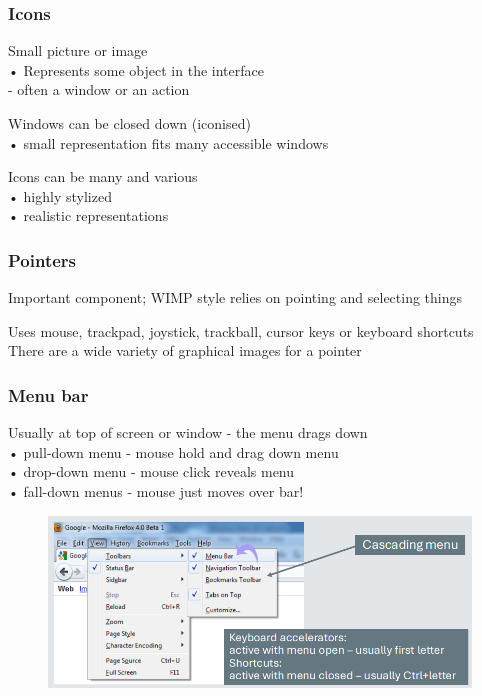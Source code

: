 \documentclass[]{project_plan}
\begin{document}
\subsubsection{Icons}
Small picture or image\\
• Represents some object in the interface\\
- often a window or an action

Windows can be closed down (iconised)\\
• small representation fits many accessible windows

Icons can be many and various\\
• highly stylized\\
• realistic representations

\subsubsection{Pointers}
Important component; WIMP style relies on pointing and selecting things

Uses mouse, trackpad, joystick, trackball, cursor keys or keyboard shortcuts\\
There are a wide variety of graphical images for a pointer

\subsubsection{Menu bar}
Usually at top of screen or window - the menu drags down\\
• pull-down menu - mouse hold and drag down menu\\
• drop-down menu - mouse click reveals menu\\
• fall-down menus - mouse just moves over bar!

\begin{figure}[h!]
  \centering
  \includegraphics[width=\linewidth]{menu_bars.png}
\end{figure}
\end{document}
